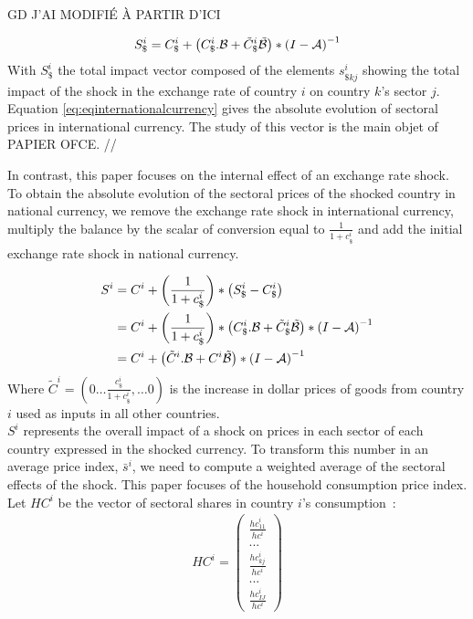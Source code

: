 \documentclass[11pt,a4paper]{article}
\begin{document}
GD J'AI MODIFIÉ À PARTIR D'ICI
 
 \begin{eqnarray}
S_\$^i=C_\$^i+\left(C_\$^i.{\cal B}+{\tilde{C}_\$^i}{\tilde{{\cal B}}}\right)*{{(I-{\cal A})}^{-1}}	
\label{eq:eqinternationalcurrency}
 \end{eqnarray}
With $S_\$^i$ the total impact vector composed of the elements ${{{s}}^i_{\$kj}}$ showing the total impact of the shock in the exchange rate of country $i$ on country $k$'s sector $j$. Equation \ref{eq:eqinternationalcurrency} gives the absolute evolution of sectoral prices in international currency. The study of this vector is the main objet of PAPIER OFCE. //

In contrast, this paper focuses on the internal effect of an exchange rate shock. To obtain the absolute evolution of the sectoral prices of the shocked country in national currency, we remove the exchange rate shock in international currency, multiply the balance by the scalar of conversion equal to $\frac{1}{1+c_\$^i}$ and add the initial exchange rate shock in national currency.

\begin{equation}
\begin{aligned}
	S^i&=C^i  + \left( \frac{1}{1+{{c}_\$^i}}\right)*\left({S_\$^i}-{{C}_{\$}^i}\right)\\
	&=C^i + \left( \frac{1}{1+{{c}_\$^i}}\right)*\left(C_\$^i.{\cal B}+{\tilde{C}_\$^i}{\tilde{{\cal B}}}\right)*{{(I-{\cal A})}^{-1}} 	\\
	&=C^i	+ \left(\tilde{C}^i.{\cal B}+{C^i}{\tilde{{\cal B}}}\right)*{{(I-{\cal A})}^{-1}}	
\label{eq:eqdomcurrency}
\end{aligned}
\end{equation}
Where $\tilde{C}^i=\left(0 \ldots \frac{c_\$^i}{1+c_\$^i},\ldots 0 \right)$ is the increase in dollar prices of goods from country $i$ used as inputs in all other countries.\\ 
$S^i$ represents the overall impact of a shock on prices in each sector of each country expressed in the shocked currency. To transform this number in an average price index, $\bar{s}^i$, we need to compute a weighted average of the sectoral effects of the shock. This paper focuses of the household consumption price index. Let $HC^i$ be the vector of sectoral shares in country $i$'s consumption :
\begin{eqnarray*}
HC^i=\left( 
	\begin{array}{c}
	\frac{{hc}_{11}^i}{hc^i} \\
	...\\
	\frac{{hc}_{kj}^i}{hc^i}\\
	...\\
	\frac{{hc}_{IJ}^i}{hc^i}
	 \end{array}
	 \right)
\end{eqnarray*}
\end{document}
